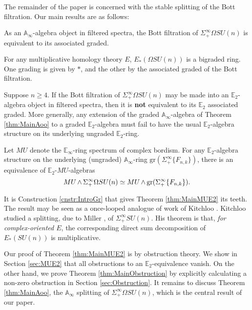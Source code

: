 The remainder of the paper is concerned with the stable splitting of the Bott filtration.  Our main results are as follows:

\begin{thm} \label{thm:MainAoo}
As an $\mathbb{A}_\infty$-algebra object in filtered spectra, the Bott filtration of $\Sigma^{\infty}_+ \Omega SU(n)$ is equivalent to its associated graded.
\end{thm}

\begin{cor}
For any multiplicative homology theory $E$, $E_*(\Omega SU(n))$ is a bigraded ring.  One grading is given by $*$, and the other by the associated graded of the Bott filtration.
\end{cor}

\begin{thm} \label{thm:MainObstruction}
Suppose $n \ge 4$.  If the Bott filtration of $\Sigma^{\infty}_+ \Omega SU(n)$ may be made into an $\mathbb{E}_2$-algebra object in filtered spectra, then it is \textbf{not} equivalent to its $\mathbb{E}_2$ associated graded.  More generally, any extension of the graded $\mathbb{A}_\infty$-algebra of Theorem \ref{thm:MainAoo} to a graded $\mathbb{E}_2$-algebra must fail to have the usual $\mathbb{E}_2$-algebra structure on its underlying ungraded $\mathbb{E}_2$-ring.
\end{thm}

\begin{thm} \label{thm:MainMUE2}
Let $MU$ denote the $\mathbb{E}_\infty$-ring spectrum of complex bordism.  For any $\mathbb{E}_2$-algebra structure on the underlying (ungraded) $\mathbb{A}_\infty$-ring $\text{gr}(\Sigma^{\infty}_+\{F_{n,k}\})$, there is an equivalence of $\mathbb{E}_2$-$MU$-algebras
$$MU \operatorname{\wedge} \Sigma^{\infty}_+ \Omega SU(n) \simeq MU \operatorname{\wedge} \text{gr}(\Sigma^{\infty}_+\{F_{n,k}\}).$$
\end{thm}

\begin{rmk}
It is Construction \ref{cnstr:IntroGr} that gives Theorem \ref{thm:MainMUE2} its teeth.  The result may be seen as a once-looped analogue of work of Kitchloo \cite{Kitchloo}.   Kitchloo studied a splitting, due to Miller \cite{MillerSplitting}, of $\Sigma^{\infty}_+ SU(n)$.  His theorem is that, \textit{for complex-oriented $E$}, the corresponding direct sum decomposition of $E_*(SU(n))$ is multiplicative.
\end{rmk}

Our proof of Theorem \ref{thm:MainMUE2} is by obstruction theory.  We show in Section \ref{sec:MUE2} that all obstructions to an $\mathbb{E}_2$-equivalence vanish.  On the other hand, we prove Theorem \ref{thm:MainObstruction} by explicitly calculating a non-zero obstruction in Section \ref{sec:Obstruction}.  It remains to discuss Theorem \ref{thm:MainAoo}, the $\mathbb{A}_\infty$ splitting of $\Sigma^{\infty}_+ \Omega SU(n)$, which is the central result of our paper.

